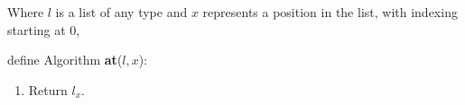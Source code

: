  \begin{framed}
  Where $l$ is a list of any type and $x$ represents a position
  in the list, with indexing starting at 0,

  \vspace{12pt}
  define Algorithm \textbf{at}($l, x$):
 
  \begin{enumerate}
   \item Return $l_x$.
  \end{enumerate}
 \end{framed}


